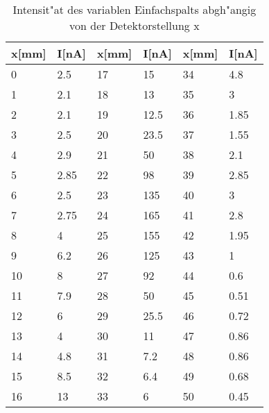 \begin{table}[h]	
\centering
\begin{tabular}{|l l||l l||l l|} \hline
	x[mm] & I[nA] & x[mm] & I[nA] & x[mm] & I[nA]\\
	\hline
	0	&	2.5   &  17	&	15  & 34	&	4.8\\
	1	&	2.1   &  18	&	13  & 35	&	3\\
	2	&	2.1   &  19	&	12.5& 36	&	1.85\\
	3	&	2.5   &  20	&	23.5& 37	&	1.55\\
	4	&	2.9   &  21	&	50  & 38	&	2.1 \\
	5	&	2.85  &  22	&	98  & 39	&	2.85\\
	6	&	2.5   &  23	&	135 & 40	&	3\\
	7	&	2.75  &  24	&	165 & 41	&	2.8\\
	8	&	4     &  25	&	155 & 42	&	1.95\\
	9	&	6.2   &  26	&	125 & 43	&	1\\
	10	&	8     &  27	&	92  & 44	&	0.6\\
	11	&	7.9   &  28	&	50  & 45	&	0.51\\
	12	&	6     &  29	&	25.5& 46	&	0.72\\
	13	&	4     &  30	&	11  & 47	&	0.86\\
	14	&	4.8   &  31	&	7.2 & 48	&	0.86\\
	15	&	8.5   &  32	&	6.4 & 49	&	0.68\\
	16	&	13    &  33	&	6   & 50	&	0.45\\
	\hline
\end{tabular}
\caption{Intensit"at des variablen Einfachspalts abgh"angig von der Detektorstellung x}
\label{tabelle_2}
\end{table}

